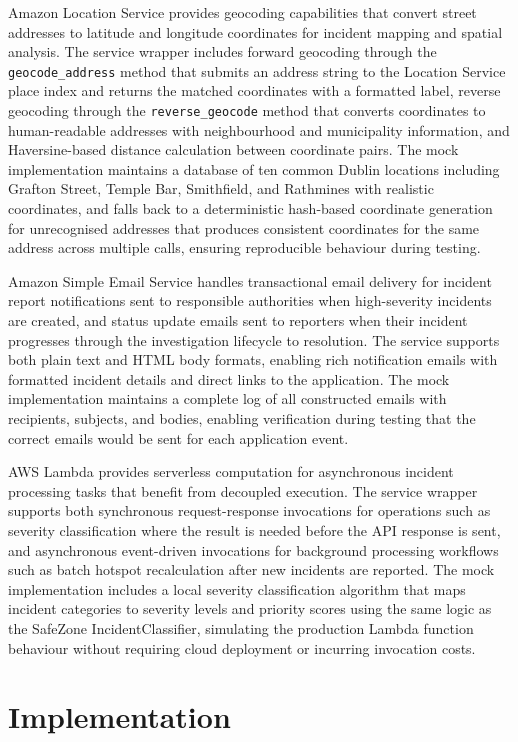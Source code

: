 \documentclass[conference]{IEEEtran}
\begin{document}
Amazon Location Service provides geocoding capabilities that convert street addresses to latitude and longitude coordinates for incident mapping and spatial analysis. The service wrapper includes forward geocoding through the \texttt{geocode\_address} method that submits an address string to the Location Service place index and returns the matched coordinates with a formatted label, reverse geocoding through the \texttt{reverse\_geocode} method that converts coordinates to human-readable addresses with neighbourhood and municipality information, and Haversine-based distance calculation between coordinate pairs. The mock implementation maintains a database of ten common Dublin locations including Grafton Street, Temple Bar, Smithfield, and Rathmines with realistic coordinates, and falls back to a deterministic hash-based coordinate generation for unrecognised addresses that produces consistent coordinates for the same address across multiple calls, ensuring reproducible behaviour during testing.

Amazon Simple Email Service handles transactional email delivery for incident report notifications sent to responsible authorities when high-severity incidents are created, and status update emails sent to reporters when their incident progresses through the investigation lifecycle to resolution. The service supports both plain text and HTML body formats, enabling rich notification emails with formatted incident details and direct links to the application. The mock implementation maintains a complete log of all constructed emails with recipients, subjects, and bodies, enabling verification during testing that the correct emails would be sent for each application event.

AWS Lambda provides serverless computation for asynchronous incident processing tasks that benefit from decoupled execution. The service wrapper supports both synchronous request-response invocations for operations such as severity classification where the result is needed before the API response is sent, and asynchronous event-driven invocations for background processing workflows such as batch hotspot recalculation after new incidents are reported. The mock implementation includes a local severity classification algorithm that maps incident categories to severity levels and priority scores using the same logic as the SafeZone IncidentClassifier, simulating the production Lambda function behaviour without requiring cloud deployment or incurring invocation costs.

\section{Implementation}
\end{document}
